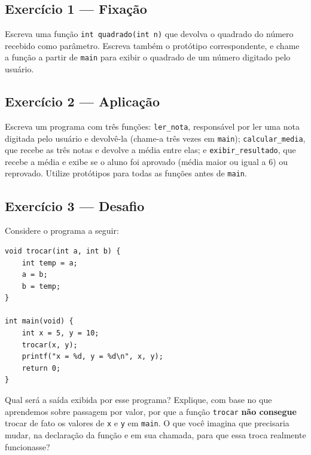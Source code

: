 \begin{exercicio}

\subsection*{Exercício 1 --- Fixação}
Escreva uma função \texttt{int quadrado(int n)} que devolva o quadrado do número recebido como parâmetro. Escreva também o protótipo correspondente, e chame a função a partir de \texttt{main} para exibir o quadrado de um número digitado pelo usuário.

\subsection*{Exercício 2 --- Aplicação}
Escreva um programa com três funções: \texttt{ler\_nota}, responsável por ler uma nota digitada pelo usuário e devolvê-la (chame-a três vezes em \texttt{main}); \texttt{calcular\_media}, que recebe as três notas e devolve a média entre elas; e \texttt{exibir\_resultado}, que recebe a média e exibe se o aluno foi aprovado (média maior ou igual a 6) ou reprovado. Utilize protótipos para todas as funções antes de \texttt{main}.

\subsection*{Exercício 3 --- Desafio}
Considere o programa a seguir:

\begin{lstlisting}
void trocar(int a, int b) {
    int temp = a;
    a = b;
    b = temp;
}

int main(void) {
    int x = 5, y = 10;
    trocar(x, y);
    printf("x = %d, y = %d\n", x, y);
    return 0;
}
\end{lstlisting}

Qual será a saída exibida por esse programa? Explique, com base no que aprendemos sobre passagem por valor, por que a função \texttt{trocar} \textbf{não consegue} trocar de fato os valores de \texttt{x} e \texttt{y} em \texttt{main}. O que você imagina que precisaria mudar, na declaração da função e em sua chamada, para que essa troca realmente funcionasse?

\end{exercicio}


